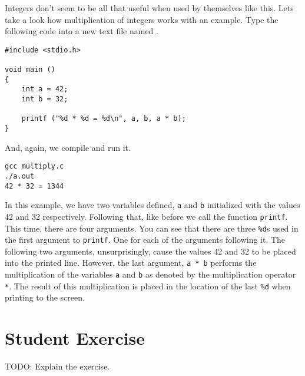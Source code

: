 Integers don't seem to be all that useful when used by themselves like this.
Lets take a look how multiplication of integers works with an example. Type
the following code into a new text file named .

\begin{Verbatim}
#include <stdio.h>

void main ()
{
    int a = 42;
    int b = 32;

    printf ("%d * %d = %d\n", a, b, a * b);
}
\end{Verbatim}

And, again, we compile and run it.

\begin{Verbatim}
gcc multiply.c
./a.out
42 * 32 = 1344
\end{Verbatim}

In this example, we have two variables defined, \verb|a| and \verb|b|
initialized with the values 42 and 32 respectively. Following that, like before
we call the function \verb|printf|. This time, there are four arguments. You can
see that there are three \verb|%d|s used in the first argument to \verb|printf|.
One for each of the arguments following it. The following two arguments,
unsurprisingly, cause the values 42 and 32 to be placed into the printed line.
However, the last argument, \verb|a * b| performs the multiplication of the
variables \verb|a| and \verb|b| as denoted by the multiplication operator
\verb|*|. The result of this multiplication is placed in the location of the
last \verb|%d| when printing to the screen.

\section{Student Exercise}

TODO: Explain the exercise.
